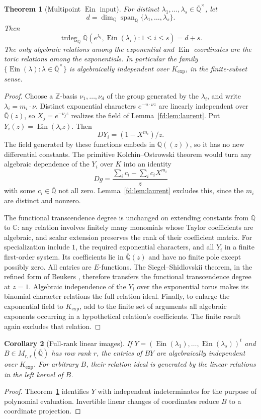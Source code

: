 \documentclass[11pt,a4paper]{article}
\newcommand{\Q}{\mathbb Q}
\newcommand{\Z}{\mathbb Z}
\newcommand{\C}{\mathbb C}
\newcommand{\Qbar}{\overline{\mathbb Q}}
\newcommand{\Ein}{\operatorname{Ein}}
\newtheorem{theorem}{Theorem}[section]
\newtheorem{corollary}[theorem]{Corollary}
\theoremstyle{definition}
\theoremstyle{remark}
\numberwithin{equation}{section}
\begin{document}
\begin{theorem}[Multipoint $\Ein$ input]\label{fd:thm:multipoint}
For distinct $\lambda_1,\ldots,\lambda_s\in\Qbar^\times$, let
\[
d=\dim_{\Q}\operatorname{span}_{\Q}\{\lambda_1,\ldots,\lambda_s\}.
\]
Then
\[
 \operatorname{trdeg}_{\Qbar}
 \Qbar(e^{\lambda_i},\Ein(\lambda_i):1\le i\le s)=d+s.
\]
The only algebraic relations among the exponential and $\Ein$ coordinates
are the toric relations among the exponentials.  In particular the family
$\{\Ein(\lambda):\lambda\in\Qbar^\times\}$ is algebraically independent
over $K_{\exp}$, in the finite-subset sense.
\end{theorem}
\begin{proof}
Choose a $\Z$-basis $\nu_1,\ldots,\nu_d$ of the group generated by the
$\lambda_i$, and write $\lambda_i=m_i\cdot\nu$.  Distinct exponential
characters $e^{-u\cdot\nu z}$ are linearly independent over $\Qbar(z)$,
so $X_j=e^{-\nu_jz}$ realizes the field of Lemma~\ref{fd:lem:laurent}.
Put $Y_i(z)=\Ein(\lambda_i z)$.  Then
\[
 DY_i=(1-X^{m_i})/z.
\]
The field generated by these functions embeds in $\Qbar((z))$, so it has
no new differential constants.  The primitive Kolchin--Ostrowski theorem
\cite{fd:Kolchin} would turn any algebraic dependence of the $Y_i$ over
$K$ into an identity
\[
 Dg=\frac{\sum_i c_i-\sum_i c_iX^{m_i}}z
\]
with some $c_i\in\Qbar$ not all zero.  Lemma~\ref{fd:lem:laurent} excludes
this, since the $m_i$ are distinct and nonzero.

The functional transcendence degree is unchanged on extending constants
from $\Qbar$ to $\C$: any relation involves finitely many monomials
whose Taylor coefficients are algebraic, and scalar extension preserves
the rank of their coefficient matrix.  For specialization include $1$,
the required exponential characters, and
all $Y_i$ in a finite first-order system.  Its coefficients lie in
$\Qbar(z)$ and have no finite pole except possibly zero.  All entries
are $E$-functions.  The Siegel--Shidlovskii theorem, in the refined form
of Beukers \cite{pm:Beukers2006}, therefore transfers the functional
transcendence degree at $z=1$.  Algebraic independence of the $Y_i$
over the exponential torus makes its binomial character relations the
full relation ideal.  Finally, to enlarge the exponential field to
$K_{\exp}$, add to the finite set of arguments all algebraic exponents
occurring in a hypothetical relation's coefficients.  The finite result
again excludes that relation.
\end{proof}

\begin{corollary}[Full-rank linear images]\label{fd:cor:linear}
If $Y=(\Ein(\lambda_1),\ldots,\Ein(\lambda_s))^t$ and
$B\in M_{r,s}(\Qbar)$ has row rank $r$, the entries of $BY$ are
algebraically independent over $K_{\exp}$.  For arbitrary $B$, their
relation ideal is generated by the linear relations in the left kernel
of $B$.
\end{corollary}
\begin{proof}
Theorem~\ref{fd:thm:multipoint} identifies $Y$ with independent
indeterminates for the purpose of polynomial evaluation.  Invertible
linear changes of coordinates reduce $B$ to a coordinate projection.
\end{proof}
\end{document}
